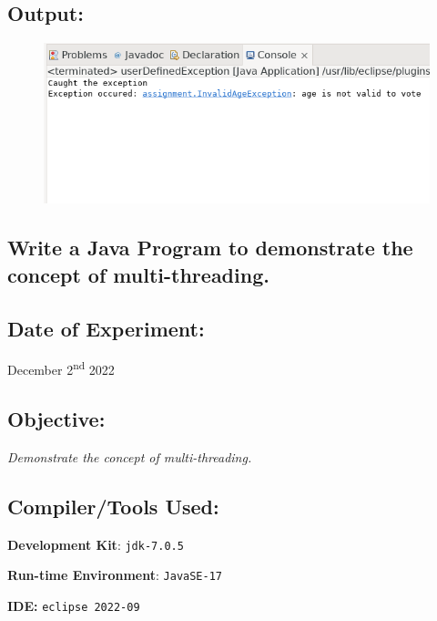 \documentclass[12pt, a4paper]{article}
\begin{document}
\subsection*{Output:}
\begin{figure}[h]
  \centering
  \includegraphics[width=\textwidth]{userDefinedException1}
\end{figure}
\newpage

\begin{tcolorbox}
\section{Write a Java Program to demonstrate the concept of multi-threading.}
\end{tcolorbox}

\subsection*{Date of Experiment:}
December 2\textsuperscript{nd} 2022
\subsection*{Objective:}
\emph{\large{Demonstrate the concept of multi-threading.}}

\subsection*{Compiler/Tools Used:}
\textbf{Development Kit}: \verb+jdk-7.0.5+

\textbf{Run-time Environment}: \verb+JavaSE-17+

\textbf{IDE:} \verb+eclipse 2022-09+
\end{document}
